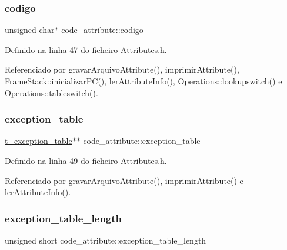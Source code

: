 \mbox{\label{structcode__attribute_a34d2f27374b7101b524e178078c15a98}} 
\subsubsection{\texorpdfstring{codigo}{codigo}}
{\footnotesize\ttfamily unsigned char$\ast$ code\+\_\+attribute\+::codigo}



Definido na linha 47 do ficheiro Attributes.\+h.



Referenciado por gravar\+Arquivo\+Attribute(), imprimir\+Attribute(), Frame\+Stack\+::inicializar\+P\+C(), ler\+Attribute\+Info(), Operations\+::lookupswitch() e Operations\+::tableswitch().

\mbox{\label{structcode__attribute_a7d1657d4edf179c1596f9c102a887b3e}} 
\subsubsection{\texorpdfstring{exception\+\_\+table}{exception\_table}}
{\footnotesize\ttfamily \hyperlink{structt__exception__table}{t\+\_\+exception\+\_\+table}$\ast$$\ast$ code\+\_\+attribute\+::exception\+\_\+table}



Definido na linha 49 do ficheiro Attributes.\+h.



Referenciado por gravar\+Arquivo\+Attribute(), imprimir\+Attribute() e ler\+Attribute\+Info().

\mbox{\label{structcode__attribute_a52263ac885da86196b36a51e7ee5bd6e}} 
\subsubsection{\texorpdfstring{exception\+\_\+table\+\_\+length}{exception\_table\_length}}
{\footnotesize\ttfamily unsigned short code\+\_\+attribute\+::exception\+\_\+table\+\_\+length}



